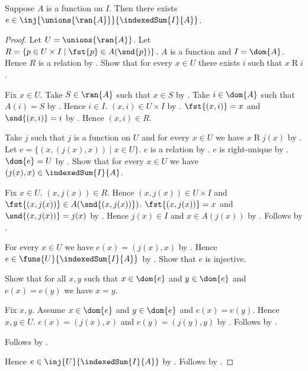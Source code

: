 \begin{theorem}\label{indexed_union_injection_into_sum}
    Suppose $A$ is a function on $I$.
    Then there exists
        $e\in\inj{\unions{\ran{A}}}{\indexedSum{I}{A}}$.
\end{theorem}
\begin{proof}
    Let $U=\unions{\ran{A}}$.
    Let $R=\{p\in U\times I\mid \fst{p}\in A(\snd{p})\}$.
    $A$ is a function and $I=\dom{A}$.
    Hence $R$ is a relation by
        .
    Show that for every $x\in U$ there exists $i$ such that
        $x\mathrel{R}i$.
    \begin{subproof}
        Fix $x\in U$.
        Take $S\in\ran{A}$ such that $x\in S$ by .
        Take $i\in\dom{A}$ such that $A(i)=S$ by .
        Hence $i\in I$.
        $(x,i)\in U\times I$ by .
        $\fst{(x,i)}=x$ and $\snd{(x,i)}=i$ by .
        Hence $(x,i)\in R$.
    \end{subproof}
    Take $j$ such that $j$ is a function on $U$ and
        for every $x\in U$ we have $x\mathrel{R}j(x)$
        by .
    Let $e=\{(x,(j(x),x))\mid x\in U\}$.
    $e$ is a relation by .
    $e$ is right-unique by .
    $\dom{e}=U$ by .
    Show that for every $x\in U$ we have
        $(j(x),x)\in\indexedSum{I}{A}$.
    \begin{subproof}
        Fix $x\in U$.
        $(x,j(x))\in R$.
        Hence $(x,j(x))\in U\times I$ and
            $\fst{(x,j(x))}\in A(\snd{(x,j(x))})$.
        $\fst{(x,j(x))}=x$ and $\snd{(x,j(x))}=j(x)$
            by .
        Hence $j(x)\in I$ and $x\in A(j(x))$
            by .
        Follows by .
    \end{subproof}
    For every $x\in U$ we have $e(x)=(j(x),x)$
        by .
    Hence $e\in\funs{U}{\indexedSum{I}{A}}$ by .
    Show that $e$ is injective.
    \begin{subproof}
        Show that for all $x,y$ such that $x\in\dom{e}$ and
            $y\in\dom{e}$ and $e(x)=e(y)$ we have $x=y$.
        \begin{subproof}
            Fix $x,y$.
            Assume $x\in\dom{e}$ and $y\in\dom{e}$ and $e(x)=e(y)$.
            Hence $x,y\in U$.
            $e(x)=(j(x),x)$ and $e(y)=(j(y),y)$
                by .
            Follows by .
        \end{subproof}
        Follows by .
    \end{subproof}
    Hence $e\in\inj{U}{\indexedSum{I}{A}}$
        by .
    Follows by \auto.
\end{proof}
